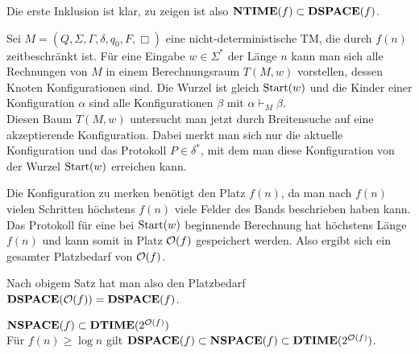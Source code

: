 \begin{Beweis}
    Die erste Inklusion ist klar, zu zeigen ist also $\mathbf{NTIME}(f) \subset \mathbf{DSPACE}(f)$.

    Sei $M = (Q, \Sigma, \Gamma, \delta, q_0, F, \Box)$ eine nicht-deterministische TM,
    die durch $f(n)$ zeitbeschränkt ist.
    Für eine Eingabe $w \in \Sigma^\ast$ der Länge $n$ kann man sich alle Rechnungen von $M$
    in einem Berechnungsraum $T(M, w)$ vorstellen,
    dessen Knoten Konfigurationen sind.
    Die Wurzel ist gleich $\text{Start}(w)$ und
    die Kinder einer Konfiguration $\alpha$ sind alle Konfigurationen $\beta$ mit
    $\alpha \vdash_M \beta$.\\
    Diesen Baum $T(M, w)$ untersucht man jetzt durch Breitensuche auf eine akzeptierende
    Konfiguration.
    Dabei merkt man sich nur die aktuelle Konfiguration und das Protokoll $P \in \delta^\ast$,
    mit dem man diese Konfiguration von der Wurzel $\text{Start}(w)$ erreichen kann.

    Die Konfiguration zu merken benötigt den Platz $f(n)$, da man nach $f(n)$ vielen Schritten
    höchstens $f(n)$ viele Felder des Bands beschrieben haben kann.
    Das Protokoll für eine bei $\text{Start}(w)$ beginnende Berechnung hat höchstens Länge $f(n)$ und
    kann somit in Platz $\mathcal{O}(f)$ gespeichert werden.
    Also ergibt sich ein gesamter Platzbedarf von $\mathcal{O}(f)$.

    Nach obigem Satz hat man also den Platzbedarf $\mathbf{DSPACE}(\mathcal{O}(f)) = \mathbf{DSPACE}(f)$.
\end{Beweis}

\linie

\begin{Satz}{$\mathbf{NSPACE}(f) \subset \mathbf{DTIME}(2^{\mathcal{O}(f)})$}\\
    Für $f(n) \ge \log n$ gilt $\mathbf{DSPACE}(f) \subset \mathbf{NSPACE}(f) \subset \mathbf{DTIME}(2^{\mathcal{O}(f)})$.
\end{Satz}

